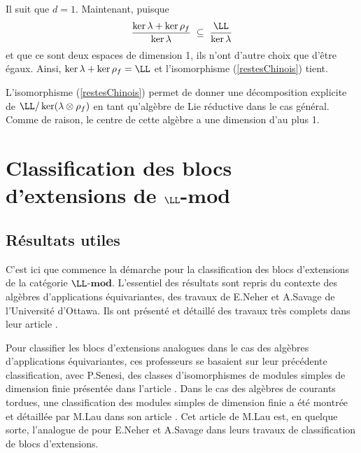 Il suit que $d = 1$. Maintenant, puisque 
$$ \frac{\ker \lambda + \ker \rho_f}{\ker \lambda} \; \subseteq \; \frac{\LL}{\ker \lambda} $$ 
et que ce sont deux espaces de dimension 1, ils n'ont d'autre choix que d'être égaux. Ainsi, $\ker \lambda + \ker \rho_f = \LL$ et l'isomorphisme (\ref{restesChinois}) tient.

\begin{Rem} L'isomorphisme (\ref{restesChinois}) permet de donner une décomposition explicite de $\LL / \ker (\lambda \otimes \rho_f)$ en tant qu'algèbre de Lie réductive dans le cas général. Comme de raison, le centre de cette algèbre a une dimension d'au plus 1.

\end{Rem}




\section{Classification des blocs d'extensions de $\LL$-$\mathbf{mod}$}
%
\subsection{Résultats utiles}

C'est ici que commence la démarche pour la classification des blocs d'extensions de la catégorie $\LL$-$\mathbf{mod}$. L'essentiel des résultats sont repris du contexte des algèbres d'applications équivariantes, des travaux de E.Neher et A.Savage de l'Université d'Ottawa. Ils ont présenté et détaillé des travaux très complets dans leur article \cite{NSext}. 

Pour classifier les blocs d'extensions analogues dans le cas des algèbres d'applications équivariantes, ces professeurs se basaient sur leur précédente classification, avec P.Senesi, des classes d'isomorphismes de modules simples de dimension finie présentée dans l'article \cite{NSSreps}. Dans le cas des algèbres de courants tordues, une classification des modules simples de dimension finie a été montrée et détaillée par M.Lau dans son article \cite{LauTCA}. Cet article de M.Lau est, en quelque sorte, l'analogue de \cite{NSSreps} pour E.Neher et A.Savage dans leurs travaux de classification de blocs d'extensions.

